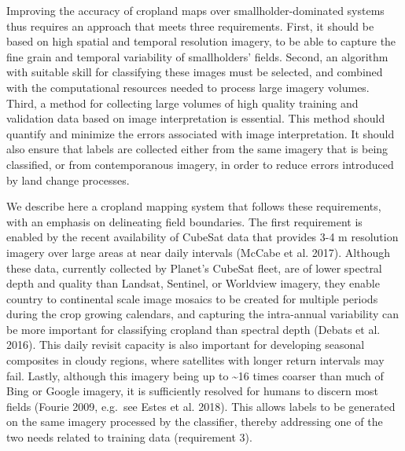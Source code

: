 \documentclass[11pt,a4paper]{article}
\begin{document}
Improving the accuracy of cropland maps over smallholder-dominated
systems thus requires an approach that meets three requirements. First,
it should be based on high spatial and temporal resolution imagery, to
be able to capture the fine grain and temporal variability of
smallholders' fields. Second, an algorithm with suitable skill for
classifying these images must be selected, and combined with the
computational resources needed to process large imagery volumes. Third,
a method for collecting large volumes of high quality training and
validation data based on image interpretation is essential. This method
should quantify and minimize the errors associated with image
interpretation. It should also ensure that labels are collected either
from the same imagery that is being classified, or from contemporanous
imagery, in order to reduce errors introduced by land change processes.

We describe here a cropland mapping system that follows these
requirements, with an emphasis on delineating field boundaries. The
first requirement is enabled by the recent availability of CubeSat data
that provides 3-4 m resolution imagery over large areas at near daily
intervals (McCabe et al. 2017). Although these data, currently collected
by Planet's CubeSat fleet, are of lower spectral depth and quality than
Landsat, Sentinel, or Worldview imagery, they enable country to
continental scale image mosaics to be created for multiple periods
during the crop growing calendars, and capturing the intra-annual
variability can be more important for classifying cropland than spectral
depth (Debats et al. 2016). This daily revisit capacity is also
important for developing seasonal composites in cloudy regions, where
satellites with longer return intervals may fail. Lastly, although this
imagery being up to \textasciitilde16 times coarser than much of Bing or
Google imagery, it is sufficiently resolved for humans to discern most
fields (Fourie 2009, e.g.~see Estes et al. 2018). This allows labels to
be generated on the same imagery processed by the classifier, thereby
addressing one of the two needs related to training data (requirement
3).
\end{document}
